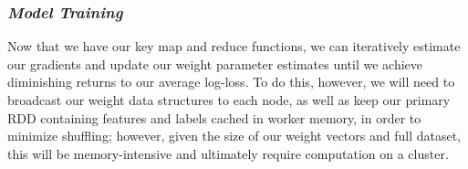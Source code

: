 \documentclass[11pt]{article}
\begin{document}
    \subsubsection{\texorpdfstring{\emph{Model
Training}}{Model Training}}\label{model-training}

Now that we have our key map and reduce functions, we can iteratively
estimate our gradients and update our weight parameter estimates until
we achieve diminishing returns to our average log-loss. To do this,
however, we will need to broadcast our weight data structures to each
node, as well as keep our primary RDD containing features and labels
cached in worker memory, in order to minimize shuffling; however, given
the size of our weight vectors and full dataset, this will be
memory-intensive and ultimately require computation on a cluster.
\end{document}
